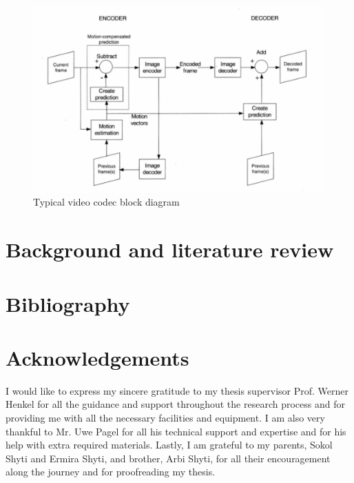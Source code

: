 \documentclass[a4paper,11pt,oneside]{article}
\begin{document}
\begin{figure}
  \centering
  \includegraphics[width=\textwidth]{../figures/f1_codec_block_diagram.pdf}
  \caption{Typical video codec block diagram\cite[p.~44]{richardson2002video}}
  \label{figure:codec_block_diagram}
\end{figure}



\newpage
\section{Background and literature review}












\newpage
\section*{Bibliography}
\printbibliography


\newpage
\section*{Acknowledgements}

I would like to express my sincere gratitude to my thesis supervisor Prof. Werner Henkel for all the guidance and support throughout the research process and for providing me with all the necessary facilities and equipment. I am also very thankful to Mr. Uwe Pagel for all his technical support and expertise and for his help with extra required materials. Lastly, I am grateful to my parents, Sokol Shyti and Ermira Shyti, and brother, Arbi Shyti, for all their encouragement along the journey and for proofreading my thesis.
\end{document}
